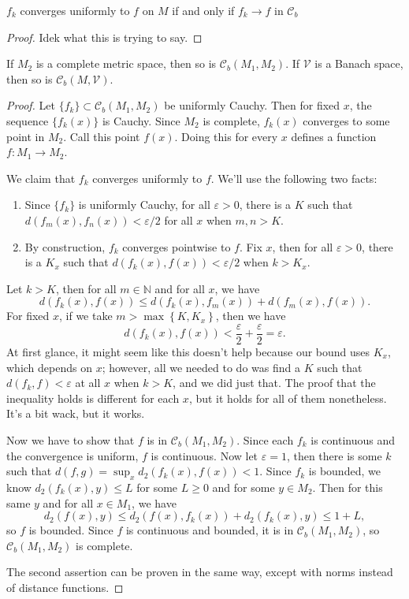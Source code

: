 \documentclass[10pt]{report}
\begin{document}
\begin{thrm}{}{}
{\color{red}$f_k$ converges uniformly to $f$ on $M$ if and only if $f_k \to f$ in $\mathcal{C}_b$}
\end{thrm}
\begin{proof}
	{\color{red}Idek what this is trying to say.}
\end{proof}

\begin{thrm}{}{}
	If $M_2$ is a complete metric space, then so is $\mathcal{C}_b(M_1,M_2)$. If $\mathcal{V}$ is a Banach space, then so is $\mathcal{C}_b(M, \mathcal{V})$.
\end{thrm}
\begin{proof}
	Let $\{f_k\} \subset \mathcal{C}_b(M_1, M_2)$ be uniformly Cauchy. Then for fixed $x$, the sequence $\{f_k(x)\}$ is Cauchy. Since $M_2$ is complete, $f_k(x) $ converges to some point in $M_2$. Call this point $f(x)$. Doing this for every $x$ defines a function $f:M_1 \to M_2$.

	We claim that $f_k$ converges uniformly to $f$. We'll use the following two facts:
	\begin{enumerate}
		\item Since $\{f_k\}$ is uniformly Cauchy, for all $\varepsilon>0$, there is a $K$ such that $d(f_m(x), f_n(x)) < \varepsilon/2$ for all $x$ when $m,n > K$.
		\item By construction, $f_k$ converges pointwise to $f$. Fix $x$, then for all $\varepsilon>0$, there is a $K_x$ such that $d(f_k(x), f(x)) < \varepsilon/2$ when $k > K_x$.
	\end{enumerate}

	Let $k > K$, then for all $m \in \mathbb{N}$ and for all $x$, we have
	\[
		d(f_k(x), f(x)) \leq d(f_k(x), f_m(x)) + d(f_m(x), f(x)).
	\] For fixed $x$, if we take $m > \max\left\{ K, K_x \right\}$, then we have
	\[
	d(f_k(x), f(x)) < \frac{\varepsilon}{2} + \frac{\varepsilon}{2} = \varepsilon.
\] At first glance, it might seem like this doesn't help because our bound uses $K_x$, which depends on $x$; however, all we needed to do was find a $K$ such that $d(f_k, f)<\varepsilon$ at all $x$ when $k > K$, and we did just that. The proof that the inequality holds is different for each $x$, but it holds for all of them nonetheless. It's a bit wack, but it works.

	Now we have to show that $f$ is in $\mathcal{C}_b(M_1, M_2)$. Since each $f_k$ is continuous and the convergence is uniform, $f$ is continuous. Now let $\varepsilon=1$, then there is some $k$ such that $d(f,g) = \sup_x d_2(f_k(x), f(x)) < 1$. Since $f_k$ is bounded, we know $d_2(f_k(x), y) \leq L$ for some $L \geq 0$ and for some $y \in M_2$. Then for this same $y$ and for all $x \in M_1$, we have
	\[
		d_2(f(x), y) \leq d_2(f(x), f_k(x)) + d_2(f_k(x), y) \leq 1 + L,
	\] so $f$ is bounded. Since $f$ is continuous and bounded, it is in $\mathcal{C}_b(M_1, M_2)$, so $\mathcal{C}_b(M_1,M_2)$ is complete.

	The second assertion can be proven in the same way, except with norms instead of distance functions.
\end{proof}
\end{document}

